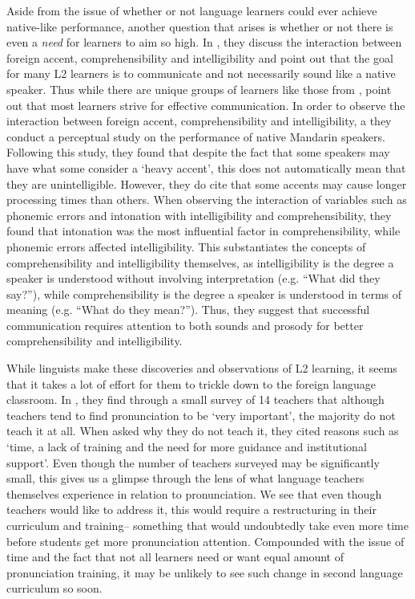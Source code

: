 \documentclass
[
    a4paper,
    twoside,
    12pt,
]
{report}
\begin{document}
Aside from the issue of whether or not language learners could ever
achieve native-like performance, another question that arises is whether
or not there is even a \textit{need} for learners to aim so high. In
\textcite{munro1999}, they discuss the interaction between foreign
accent, comprehensibility and intelligibility and point out that the
goal for many L2 learners is to communicate and not necessarily sound
like a native speaker. Thus while there are unique groups of learners
like those from \textcite{bongaerts1995}, \textcite{munro1999} point out
that most learners strive for effective communication. In order to
observe the interaction between foreign accent, comprehensibility and
intelligibility, a they conduct a perceptual study on the performance of
native Mandarin speakers. Following this study, they found that despite
the fact that some speakers may have what some consider a `heavy
accent', this does not automatically mean that they are unintelligible.
However, they do cite that some accents may cause longer processing
times than others. When observing the interaction of variables such as
phonemic errors and intonation with intelligibility and
comprehensibility, they found that intonation was the most influential
factor in comprehensibility, while phonemic errors affected
intelligibility. This substantiates the concepts of comprehensibility
and intelligibility themselves, as intelligibility is the degree a
speaker is understood without involving interpretation (e.g. ``What did
they say?''), while comprehensibility is the degree a speaker is
understood in terms of meaning (e.g. ``What do they mean?''). Thus, they
suggest that successful communication requires attention to both sounds
and prosody for better comprehensibility and intelligibility.

While linguists make these discoveries and observations of L2 learning,
it seems that it takes a lot of effort for them to trickle down to the
foreign language classroom. In \textcite{darcy2012}, they find through a
small survey of 14 teachers that although teachers tend to find
pronunciation to be `very important', the majority do not teach it at
all. When asked why they do not teach it, they cited reasons such as
`time, a lack of training and the need for more guidance and
institutional support'. Even though the number of teachers surveyed may
be significantly small, this gives us a glimpse through the lens of what
language teachers themselves experience in relation to pronunciation. We
see that even though teachers would like to address it, this would
require a restructuring in their curriculum and training-- something
that would undoubtedly take even more time before students get more
pronunciation attention. Compounded with the issue of time and the fact
that not all learners need or want equal amount of pronunciation
training, it may be unlikely to see such change in second language
curriculum so soon.
\end{document}
